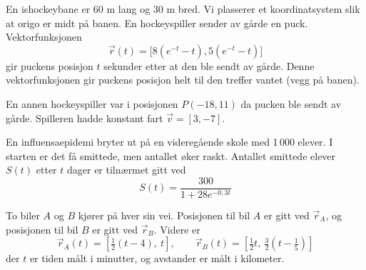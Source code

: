 \newpage
{}
En ishockeybane er 60 m lang og 30 m bred. Vi plasserer et koordinatsystem
slik at origo er midt på banen. 
En hockeyspiller sender av gårde en puck. Vektorfunksjonen 
\[
\vec{r}(t) = \big[8(e^{-t} - t), 5(e^{-t} - t)\big]
\]
gir puckens posisjon $t$ sekunder etter at den ble sendt av gårde. Denne
vektorfunksjonen gir puckens posisjon helt til den treffer vantet (vegg på
banen).


En annen hockeyspiller var i posisjonen $P(-18, 11)$ da pucken ble sendt av
gårde. Spilleren hadde konstant fart $\vec{v} = [3, -7]$.

En influensaepidemi bryter ut på en videregående skole med 1\,000 elever.
I starten er det få smittede, men antallet øker raskt. Antallet smittede
elever $S(t)$ etter $t$ dager er tilnærmet gitt ved
\[
S(t) = \frac{300}{1 + 28e^{-0{,}3t}}
\]

\newpage
{}
To biler $A$ og $B$ kjører på hver sin vei. Posisjonen til bil $A$ er gitt ved $\vec{r}_A$, og posisjonen til bil $B$ er gitt ved $\vec{r}_B$. Videre er
\[
\vec{r}_A(t) = \left[\tfrac{1}{2}(t - 4),\ t\right],\quad
\quad
\vec{r}_B(t) = \left[\tfrac{1}{2}t,\ \tfrac{3}{2}\!\left(t - \tfrac{1}{5}\right)\right]
\]
der $t$ er tiden målt i minutter, og avstander er målt i kilometer.


